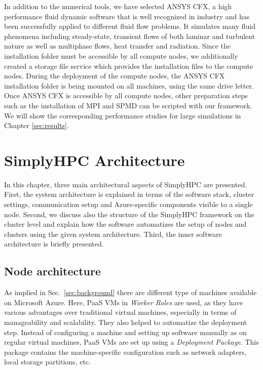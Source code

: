 \documentclass[3p,times]{elsarticle}
\begin{document}
In addition to the numerical tools, we have selected ANSYS CFX, a high performance fluid dynamic software that is well recognized in industry and has been successfully applied to different fluid flow problems. It simulates many fluid phenomena including steady-state, transient flows of both laminar and turbulent nature as well as multiphase flows, heat transfer and radiation. Since the installation folder must be accessible by all compute nodes, we additionally created a storage file service which provides the installation files to the compute nodes. During the deployment of the compute nodes, the ANSYS CFX installation folder is being mounted on all machines, using the same drive letter. Once ANSYS CFX is accessible by all compute nodes, other preparation steps such as the installation of MPI and SPMD can be scripted with our framework. We will show the corresponding performance studies for large simulations in Chapter \ref{sec:results}.

\section{SimplyHPC Architecture}
\label{sec:architecture}
In this chapter, three main architectural aspects of SimplyHPC are presented. First, the system architecture is explained in terms of the software stack, cluster settings, communication setup and Azure-specific components visible to a single node. Second, we discuss also the structure of the SimplyHPC framework on the cluster level and explain how the software automatizes the setup of nodes and clusters using the given system architecture. Third, the inner software architecture is briefly presented.

\subsection{Node architecture}

As implied in Sec.~\ref{sec:background} there are different type of machines available on Microsoft Azure. Here, PaaS VMs in \textit{Worker Roles} are used, as they have various advantages over traditional virtual machines, especially in terms of manageability and scalability. They also helped to automatize the deployment step. Instead of configuring a machine and setting up software manually as on regular virtual machines, PaaS VMs are set up using a \textit{Deployment Package}. This package contains the machine-specific configuration such as  network adapters, local storage partitions, etc. 
\end{document}
